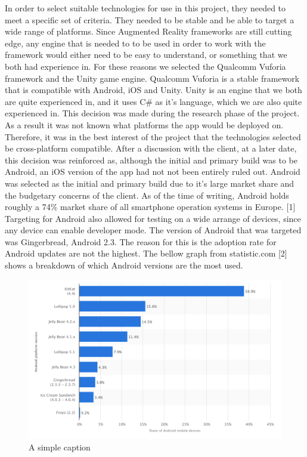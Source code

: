 In order to select suitable technologies for use in this project, they needed to meet a specific set of criteria. They needed to be stable and be able to target a wide range of platforms. Since Augmented Reality frameworks are still cutting edge, any engine that is needed to to be used in order to work with the framework would either need to be easy to understand, or something that we both had experience in. For these reasons we selected the Qualcomm Vuforia framework and the Unity game engine. Qualcomm Vuforia is a stable framework that is compatible with Android, iOS and Unity. Unity is an engine that we both are quite experienced in, and it uses C\# as it’s language, which we are also quite experienced in. This decision was made during the research phase of the project. As a result it was not known what platforms the app would be deployed on. Therefore, it was in the best interest of the project that the technologies selected be cross-platform compatible. After a discussion with the client, at a later date, this decision was reinforced as, although the initial and primary build was to be Android, an iOS version of the app had not not been entirely ruled out. Android was selected as the initial and primary build due to it’s large market share and the budgetary concerns of the client. As of the time of writing, Android holds roughly a  74\% market share of all smartphone operation systems in Europe. [1] Targeting for Android also allowed for testing on a wide arrange of devices, since any device can enable developer mode. The version of Android that was targeted was Gingerbread, Android 2.3. The reason for this is the adoption rate for Android updates are not the highest. The bellow graph from statistic.com [2] shows a breakdown of which Android versions are the most used. 

\begin{figure}[ht!]
	\centering
	\includegraphics[width=120mm]{graph1.png}
	\caption{A simple caption \label{overflow}}
\end{figure}

